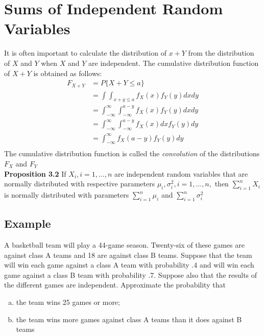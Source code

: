 \section{Sums of Independent Random Variables}
It is often important to calculate the distribution of $x + Y$ from the distribution of $X$ and $Y$ when $X$ and $Y$ are independent. The cumulative distribution function of $X + Y$ is obtained as follows:
\begin{equation*}
    \begin{split}
        F_{X + Y} &= P\{X + Y\leq a\}\\
        &= \int\int_{x+y\leq a} f_X(x)f_Y(y) dx dy\\
        &= \int^\infty_{-\infty} \int^{a-y}_{-\infty} f_X(x)f_Y(y) dx dy\\
        &= \int^\infty_{-\infty} \int^{a-y}_{-\infty} f_X(x) dx f_Y(y) dy\\
        &= \int^\infty_{-\infty} f_X(a-y)f_Y(y) dy\\
    \end{split}
\end{equation*}
The cumulative distribution function is called the \textit{convolution} of the distributions $F_X$ and $F_Y$\\
\textbf{Proposition 3.2}
If $X_i, i = 1,\dots, n$ are independent random variables that are normally distributed with respective parameters $\mu_i, \sigma^2_i,i = 1, \dots, n,$ then $\sum^n_{i=1} X_i$ is normally distributed with parameters $\sum^n_{i = 1} \mu_i$ and $\sum^n_{i = 1} \sigma^2_i$
\subsection*{Example}
A basketball team will play a 44-game season. Twenty-six of these games are
against class A teams and 18 are against class B teams. Suppose that the team
will win each game against a class A team with probability .4 and will win each
game against a class B team with probability .7. Suppose also that the results of
the different games are independent. Approximate the probability that
\begin{enumerate}[a. ]
    \item the team wins 25 games or more;
    \item the team wins more games against class A teams than it does against B teams
\end{enumerate}
